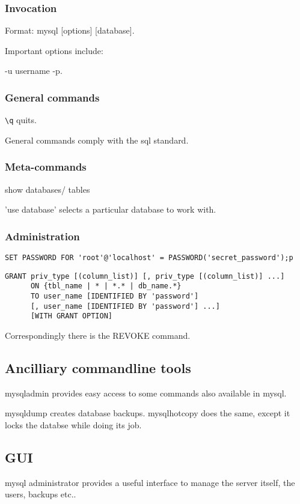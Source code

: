 \subsubsection{Invocation}
Format: mysql [options] [database].

Important options include:

-u username -p.

\subsubsection{General commands}
\verb'\q' quits.

General commands comply with the sql standard.

\subsubsection{Meta-commands}
show databases/ tables

'use database' selects a particular database to work with.

\subsubsection{Administration}
\verb[SET PASSWORD FOR 'root'@'localhost' = PASSWORD('secret_password');p[

\begin{verbatim}
GRANT priv_type [(column_list)] [, priv_type [(column_list)] ...]
      ON {tbl_name | * | *.* | db_name.*}
      TO user_name [IDENTIFIED BY 'password']
      [, user_name [IDENTIFIED BY 'password'] ...]
      [WITH GRANT OPTION]
\end{verbatim}

Correspondingly there is the REVOKE command.

\subsection{Ancilliary commandline tools}
mysqladmin provides easy access to some commands also available in mysql.

mysqldump creates database backups. mysqlhotcopy does the same, except it locks the databse while doing its job.

\tbc

\subsection{GUI}
mysql administrator provides a useful interface to manage the server itself, the users, backups etc..

